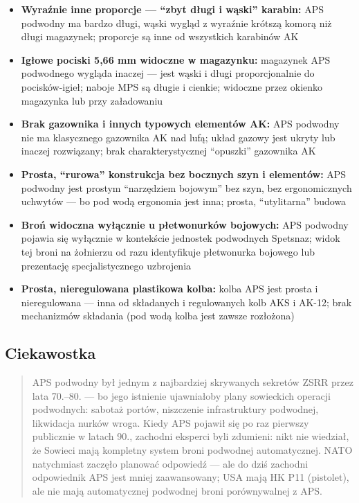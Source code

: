 \documentclass[12pt,oneside]{book}
\providecommand{\tightlist}{%
  \setlength{\itemsep}{0pt}\setlength{\parskip}{0pt}}
\begin{document}
\begin{itemize}
\tightlist
\item
  \textbf{Wyraźnie inne proporcje --- ``zbyt długi i wąski'' karabin:}
  APS podwodny ma bardzo długi, wąski wygląd z wyraźnie krótszą komorą
  niż długi magazynek; proporcje są inne od wszystkich karabinów AK
\item
  \textbf{Igłowe pociski 5,66 mm widoczne w magazynku:} magazynek APS
  podwodnego wygląda inaczej --- jest wąski i długi proporcjonalnie do
  pocisków-igieł; naboje MPS są długie i cienkie; widoczne przez okienko
  magazynka lub przy załadowaniu
\item
  \textbf{Brak gazownika i innych typowych elementów AK:} APS podwodny
  nie ma klasycznego gazownika AK nad lufą; układ gazowy jest ukryty lub
  inaczej rozwiązany; brak charakterystycznej ``opuszki'' gazownika AK
\item
  \textbf{Prosta, ``rurowa'' konstrukcja bez bocznych szyn i elementów:}
  APS podwodny jest prostym ``narzędziem bojowym'' bez szyn, bez
  ergonomicznych uchwytów --- bo pod wodą ergonomia jest inna; prosta,
  ``utylitarna'' budowa
\item
  \textbf{Broń widoczna wyłącznie u płetwonurków bojowych:} APS podwodny
  pojawia się wyłącznie w kontekście jednostek podwodnych Spetsnaz;
  widok tej broni na żołnierzu od razu identyfikuje płetwonurka bojowego
  lub prezentację specjalistycznego uzbrojenia
\item
  \textbf{Prosta, nieregulowana plastikowa kolba:} kolba APS jest prosta
  i nieregulowana --- inna od składanych i regulowanych kolb AKS i
  AK-12; brak mechanizmów składania (pod wodą kolba jest zawsze
  rozłożona)
\end{itemize}

\subsection{Ciekawostka}\label{ciekawostka-115}

\begin{quote}
APS podwodny był jednym z najbardziej skrywanych sekretów ZSRR przez
lata 70.--80. --- bo jego istnienie ujawniałoby plany sowieckich
operacji podwodnych: sabotaż portów, niszczenie infrastruktury
podwodnej, likwidacja nurków wroga. Kiedy APS pojawił się po raz
pierwszy publicznie w latach 90., zachodni eksperci byli zdumieni: nikt
nie wiedział, że Sowieci mają kompletny system broni podwodnej
automatycznej. NATO natychmiast zaczęło planować odpowiedź --- ale do
dziś zachodni odpowiednik APS jest mniej zaawansowany; USA mają HK P11
(pistolet), ale nie mają automatycznej podwodnej broni porównywalnej z
APS.
\end{quote}
\end{document}
